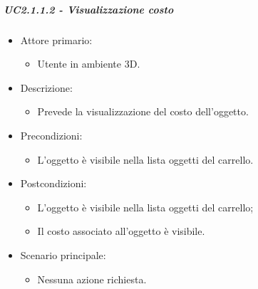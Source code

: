 \subparagraph{UC2.1.1.2 - Visualizzazione costo}
\begin{itemize}
	
	\item Attore primario: 
	\begin{itemize}
		\item Utente in ambiente 3D.
	\end{itemize}
	\item Descrizione:
	\begin{itemize}
		\item Prevede la visualizzazione del costo dell'oggetto.
	\end{itemize}
	
	\item Precondizioni:
	\begin{itemize}
		\item L'oggetto è visibile nella lista oggetti del carrello.
	\end{itemize}
	
	\item Postcondizioni:
	\begin{itemize}
		\item L'oggetto è visibile nella lista oggetti del carrello;
		\item Il costo associato all'oggetto è visibile.
	\end{itemize}
	
	\item Scenario principale:
	\begin{itemize}
		\item Nessuna azione richiesta.
	\end{itemize}
	
\end{itemize}

